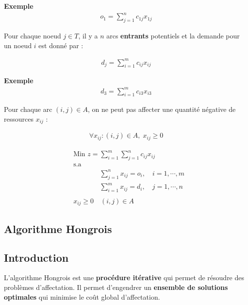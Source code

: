 \documentclass{report}
\begin{document}
\begin{multicols*}{2}

\noindent
\textbf{Exemple}  
\begin{align*}
    o_1 = \sum_{j=1}^{n}c_{1j}x_{1j}
\end{align*}

Pour chaque noeud $j\in T$, il y a $n$ arcs \textbf{entrants}   
potentiels et la demande  pour un noeud $i$ est donné par :

\begin{align*}
    d_j = \sum_{i=1}^{m}c_{ij}x_{ij}
\end{align*}

\noindent
\textbf{Exemple}  
\begin{align*}
    d_3 = \sum_{i=1}^{m}c_{i3}x_{i3}
\end{align*}


Pour chaque arc $(i, j) \in A$, on ne peut pas affecter une quantité négative 
de ressources $x_{ij}$ : 

\begin{align*}
    \forall x_{ij} : (i, j) \in A, \; x_{ij} \geq 0
\end{align*}


\begin{align*}
    &\text{Min } z = \sum_{i=1}^{m}\sum_{j=1}^{n}c_{ij}x_{ij}  
    \\ 
    &\text{s.a}
    \\
    &\phantom{\text{Min } z =} 
    \sum_{j =1}^{n} x_{ij} = o_i, \quad i = 1, \cdots, m
    \\
    &\phantom{\text{Min } z =}
    \sum_{i =1}^{m} x_{ij} = d_i, \quad j = 1, \cdots, n
    \\ 
    \\ 
    &x_{ij} \geq 0 \quad (i, j) \in A
\end{align*}

\subsection{Algorithme Hongrois}
\subsection{Introduction}

L'algorithme Hongrois est une \textbf{procédure itérative}  qui permet de résoudre 
des problèmes d'affectation. Il permet d'engendrer 
un \textbf{ensemble de solutions optimales}  qui minimise 
le coût global d'affectation. 


\end{multicols*}
\end{document}
